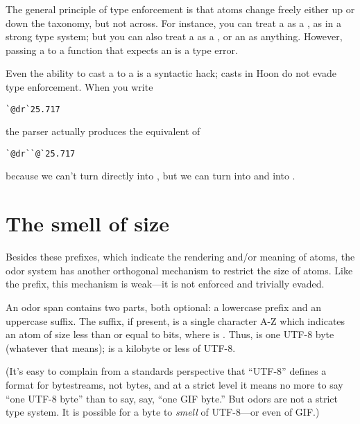The general principle of type enforcement is that atoms change
freely either up or down the taxonomy, but not across.  For
instance, you can treat a  as a , as in a strong type
system; but you can also treat a  as a , or an  as
anything.  However, passing a  to a function that expects an
 is a type error.

Even the ability to cast a  to a  is a syntactic hack;
casts in Hoon do not evade type enforcement.  When you write

\begin{framed_shaded}
\begin{Verbatim}[fontsize=\relsize{-2.5},fontseries=b,commandchars=\\\{\}]
`@dr`25.717
\end{Verbatim}
\end{framed_shaded}

the parser actually produces the equivalent of

\begin{framed_shaded}
\begin{Verbatim}[fontsize=\relsize{-2.5},fontseries=b,commandchars=\\\{\}]
`@dr``@`25.717
\end{Verbatim}
\end{framed_shaded}

because we can't turn  directly into , but we can turn
 into  and  into .

\section{The smell of size}

Besides these prefixes, which indicate the rendering and/or
meaning of atoms, the odor system has another orthogonal
mechanism to restrict the size of atoms.  Like the prefix, this
mechanism is weak---it is not enforced and trivially evaded.

An odor span contains two parts, both optional: a lowercase
prefix and an uppercase suffix.  The suffix, if present, is a
single character A-Z  which indicates an atom of size less
than or equal to  bits, where  is .
Thus,  is one UTF-8 byte (whatever that means); 
is a kilobyte or less of UTF-8.

(It's easy to complain from a standards perspective that ``UTF-8''
defines a format for bytestreams, not bytes, and at a strict
level it means no more to say ``one UTF-8 byte'' than to say, say,
``one GIF byte.''  But odors are not a strict type system.  It is
possible for a byte to \emph{smell} of UTF-8---or even of GIF.)

